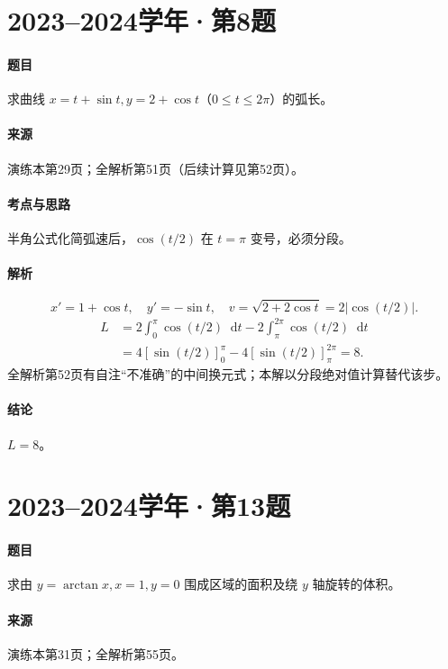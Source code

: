 \documentclass[UTF8,fontset=fandol,12pt,oneside,openany]{ctexrep}
\newcommand{\dd}{\mathop{}\!\mathrm d}
\theoremstyle{definition}
\begin{document}
\par\addvspace{18pt}\noindent\begin{minipage}{\linewidth}
\section{2023--2024学年·第8题}
\paragraph{题目}求曲线 $x=t+\sin t,y=2+\cos t$（$0\le t\le2\pi$）的弧长。
\paragraph{来源}演练本第29页；全解析第51页（后续计算见第52页）。
\end{minipage}\par
\paragraph{考点与思路}半角公式化简弧速后，$\cos(t/2)$ 在 $t=\pi$ 变号，必须分段。
\paragraph{解析}
\[
 x'=1+\cos t,\quad y'=-\sin t,
 \quad v=\sqrt{2+2\cos t}=2|\cos(t/2)|.
\]
\begin{align*}
 L&=2\int_0^\pi\cos(t/2)\dd t
 -2\int_\pi^{2\pi}\cos(t/2)\dd t\\
 &=4[\sin(t/2)]_0^\pi-4[\sin(t/2)]_\pi^{2\pi}=8.
\end{align*}
全解析第52页有自注“不准确”的中间换元式；本解以分段绝对值计算替代该步。
\paragraph{结论}$L=8$。

\par\addvspace{18pt}\noindent\begin{minipage}{\linewidth}
\section{2023--2024学年·第13题}
\paragraph{题目}求由 $y=\arctan x,x=1,y=0$ 围成区域的面积及绕 $y$ 轴旋转的体积。
\paragraph{来源}演练本第31页；全解析第55页。
\end{minipage}\par
\end{document}
